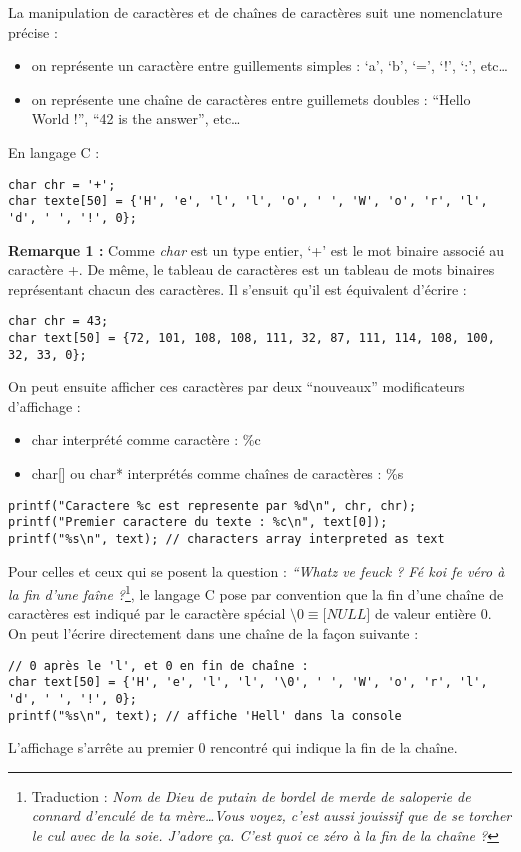 \documentclass[../../../main.tex]{subfiles}
\begin{document}
La manipulation de caractères et de chaînes de caractères suit une nomenclature précise :
\begin{itemize}
	\item on représente un caractère entre guillements simples : `a', `b', `=', `!', `:', etc\dots
	\item on représente une chaîne de caractères entre guillemets doubles : ``Hello World !'', ``42 is the answer'', etc\dots
\end{itemize}
En langage C :
\begin{verbatim}
char chr = '+';
char texte[50] = {'H', 'e', 'l', 'l', 'o', ' ', 'W', 'o', 'r', 'l', 'd', ' ', '!', 0};
\end{verbatim}
\textbf{Remarque 1 :} Comme \textit{char} est un type entier, `+' est le mot binaire associé au caractère +. De même, le tableau de caractères est un tableau de mots binaires représentant chacun des caractères. Il s'ensuit qu'il est équivalent d'écrire :
\begin{verbatim}
char chr = 43;
char text[50] = {72, 101, 108, 108, 111, 32, 87, 111, 114, 108, 100, 32, 33, 0};
\end{verbatim}
On peut ensuite afficher ces caractères par deux ``nouveaux'' modificateurs d'affichage : 
\begin{itemize}
	\item \textsf{char} interprété comme caractère : \textsf{\%c}
	\item \textsf{char[]} ou \textsf{char*} interprétés comme chaînes de caractères : \textsf{\%s}
\end{itemize}
\begin{verbatim}
printf("Caractere %c est represente par %d\n", chr, chr);
printf("Premier caractere du texte : %c\n", text[0]);
printf("%s\n", text); // characters array interpreted as text
\end{verbatim}
Pour celles et ceux qui se posent la question : \textit{``Whatz ve feuck ? Fé koi fe véro à la fin d'une faîne ?}\footnote{Traduction : \textit{Nom de Dieu de putain de bordel de merde de saloperie de connard d’enculé de ta mère\dots Vous voyez, c’est aussi jouissif que de se torcher le cul avec de la soie. J’adore ça. C'est quoi ce zéro à la fin de la chaîne ?}}, le langage C pose par convention que la fin d'une chaîne de caractères est indiqué par le caractère spécial $\setminus0\equiv\textit{[NULL]}$ de valeur entière 0. On peut l'écrire directement dans une chaîne de la façon suivante :
\begin{verbatim}
// 0 après le 'l', et 0 en fin de chaîne :
char text[50] = {'H', 'e', 'l', 'l', '\0', ' ', 'W', 'o', 'r', 'l', 'd', ' ', '!', 0};
printf("%s\n", text); // affiche 'Hell' dans la console
\end{verbatim}
L'affichage s'arrête au premier 0 rencontré qui indique la fin de la chaîne.
 
\end{document}
